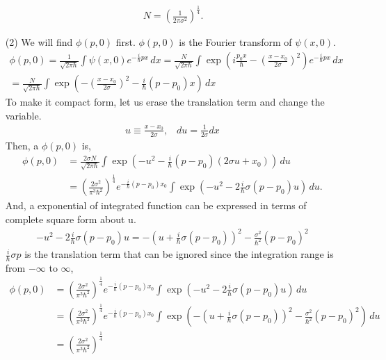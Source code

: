 \documentclass[floatfix,nofootinbib,superscriptaddress,fleqn]{revtex4}
\begin{document}
\begin{itemize}
\begin{align}
    \,N = {\left(\frac{1}{2\pi\sigma^2}\right)}^{\frac{1}{4}}.
  \end{align}
  \item[(2)]  We will find $\phi(p,0)$ first. $\phi(p,0)$ is the Fourier transform of $\psi(x,0)$.
  \begin{align}
    \phi(p,0)=\frac{1}{\sqrt{2\pi\hbar}}
    \int\psi(x,0) e^{-\frac{i}{\hbar}px}\,dx
      =\frac{N}{\sqrt{2\pi\hbar}}
      \int\exp\left(i\frac{p_0 x}{\hbar}-{\left(\frac{x-x_0}{2\sigma}\right)}^2\right) 
      e^{-\frac{i}{\hbar}px}\,dx  \\
      =\frac{N}{\sqrt{2\pi\hbar}}
      \int\exp\left(-{\left(\frac{x-x_0}{2\sigma}\right)}^2
      -\frac{i}{\hbar}(p-p_0)x\right)\,dx
  \end{align}
  To make it compact form, let us erase the translation term and change the variable.
  \begin{align}
    u \equiv \frac{x-x_0}{2\sigma},\;\;\; du = \frac{1}{2\sigma} dx 
  \end{align}
  Then, a $\phi(p,0)$ is,
  \begin{align}
    \phi(p,0)&=\frac{2\sigma N}{\sqrt{2\pi\hbar}}
    \int\exp\left(-{u}^2-\frac{i}{\hbar}(p-p_0)(2\sigma u+x_0)\right)\,du \\
             &={\left(\frac{2\sigma^2}{\pi^3\hbar^2}\right)}^{\frac{1}{4}}
    e^{-\frac{i}{\hbar}(p-p_0)x_0}
    \int\exp\left(-u^2-2\frac{i}{\hbar}\sigma (p-p_0)u\right)\,du.
  \end{align}
  And, a exponential of integrated function can be expressed in terms of complete square form about u.
  \begin{align}
    -u^2-2\frac{i}{\hbar}\sigma (p-p_0)u 
    = -{\left( u+\frac{i}{\hbar}\sigma (p-p_0)\right)}^2-\frac{\sigma^2}{\hbar^2}{(p-p_0)}^2
  \end{align}
  $\frac{i}{\hbar}\sigma p$ is the translation term that can be ignored since the integration range is from $-\infty$ to $\infty$,
  \begin{align}
    \phi(p,0) &= {\left(\frac{2\sigma^2}{\pi^3\hbar^2}\right)}^{\frac{1}{4}}
    e^{-\frac{i}{\hbar}(p-p_0)x_0}
    \int\exp\left(-u^2-2\frac{i}{\hbar}\sigma (p-p_0)u\right)\,du \\
    &={\left(\frac{2\sigma^2}{\pi^3\hbar^2}\right)}^{\frac{1}{4}}
    e^{-\frac{i}{\hbar}(p-p_0)x_0}  
    \int\exp\left(-{\left( u+\frac{i}{\hbar}\sigma (p-p_0)\right)}^2-\frac{\sigma^2}{\hbar^2}(p-p_0)^2\right)\,du \\
    &= {\left(\frac{2\sigma^2}{\pi^3\hbar^2}\right)}^{\frac{1}{4}}

\end{align}
\end{itemize}
\end{document}
